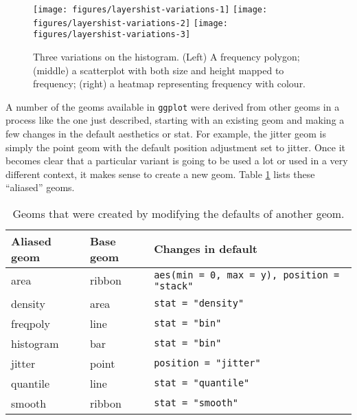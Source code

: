 \begin{figure}

{\centering \texttt{[image: figures/layershist-variations-1]} \texttt{[image: figures/layershist-variations-2]} \texttt{[image: figures/layershist-variations-3]} 

}

\caption{Three variations on the histogram. (Left) A frequency polygon; (middle) a scatterplot with both size and height mapped to frequency; (right) a heatmap representing frequency with colour.\label{fig:hist-variations}}
\end{figure}

A number of the geoms available in \texttt{ggplot} were derived from
other geoms in a process like the one just described, starting with an
existing geom and making a few changes in the default aesthetics or
stat. For example, the jitter geom is simply the point geom with the
default position adjustment set to jitter. Once it becomes clear that a
particular variant is going to be used a lot or used in a very different
context, it makes sense to create a new geom. Table
\ref{tbl:aliased-geoms} lists these ``aliased'' geoms.

\begin{table}
  \begin{center}
  \begin{tabular}{lll}
    \toprule
    Aliased geom & Base geom & Changes in default \\
    \midrule
    area      & ribbon & \verb!aes(min = 0, max = y), position = "stack"!  \\
    density   & area   & \verb!stat = "density"!    \\
    freqpoly  & line   & \verb!stat = "bin"!        \\
    histogram & bar    & \verb!stat = "bin"!        \\
    jitter    & point  & \verb!position = "jitter"! \\
    quantile  & line   & \verb!stat = "quantile"!   \\
    smooth    & ribbon & \verb!stat = "smooth"!     \\
    \bottomrule
  \end{tabular}
  \end{center}
  \caption{Geoms that were created by modifying the defaults of another geom.}
  \label{tbl:aliased-geoms}
\end{table}

